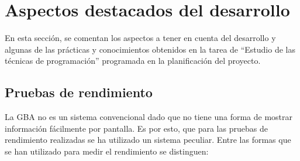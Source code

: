 \section{Aspectos destacados del desarrollo}
En esta sección, se comentan los aspectos a tener en cuenta del desarrollo y algunas de las prácticas y conocimientos obtenidos en la tarea de ``Estudio de las técnicas de programación'' programada en la planificación del proyecto.

\subsection{Pruebas de rendimiento}
La GBA no es un sistema convencional dado que no tiene una forma de mostrar información fácilmente por pantalla. Es por esto, que para las pruebas de rendimiento realizadas se ha utilizado un sistema peculiar. Entre las formas que se han utilizado para medir el rendimiento se distinguen:

